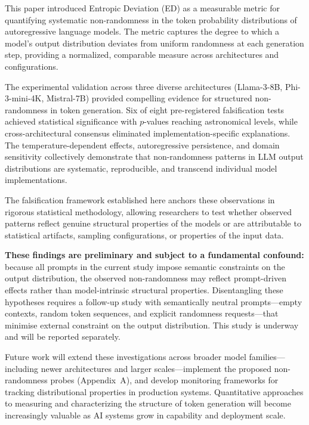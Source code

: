 \documentclass[12pt]{article}
\begin{document}
This paper introduced Entropic Deviation (ED) as a measurable metric for quantifying systematic non-randomness in the token probability distributions of autoregressive language models. The metric captures the degree to which a model's output distribution deviates from uniform randomness at each generation step, providing a normalized, comparable measure across architectures and configurations.

The experimental validation across three diverse architectures (Llama-3-8B, Phi-3-mini-4K, Mistral-7B) provided compelling evidence for structured non-randomness in token generation. Six of eight pre-registered falsification tests achieved statistical significance with $p$-values reaching astronomical levels, while cross-architectural consensus eliminated implementation-specific explanations. The temperature-dependent effects, autoregressive persistence, and domain sensitivity collectively demonstrate that non-randomness patterns in LLM output distributions are systematic, reproducible, and transcend individual model implementations.

The falsification framework established here anchors these observations in rigorous statistical methodology, allowing researchers to test whether observed patterns reflect genuine structural properties of the models or are attributable to statistical artifacts, sampling configurations, or properties of the input data.

\textbf{These findings are preliminary and subject to a fundamental confound:} because all prompts in the current study impose semantic constraints on the output distribution, the observed non-randomness may reflect prompt-driven effects rather than model-intrinsic structural properties. Disentangling these hypotheses requires a follow-up study with semantically neutral prompts---empty contexts, random token sequences, and explicit randomness requests---that minimise external constraint on the output distribution. This study is underway and will be reported separately.

Future work will extend these investigations across broader model families---including newer architectures and larger scales---implement the proposed non-randomness probes (Appendix~A), and develop monitoring frameworks for tracking distributional properties in production systems. Quantitative approaches to measuring and characterizing the structure of token generation will become increasingly valuable as AI systems grow in capability and deployment scale.
\end{document}

